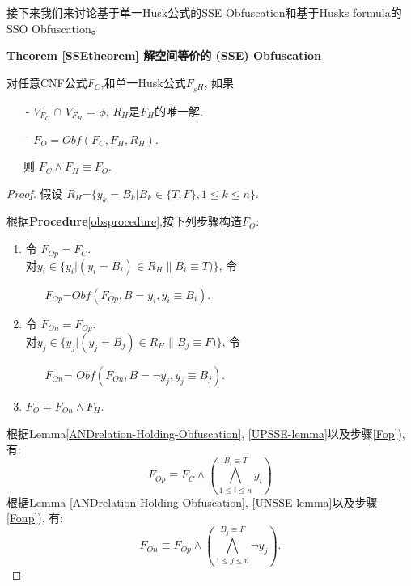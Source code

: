 接下来我们来讨论基于单一Husk公式的SSE Obfuscation和基于Husks formula的SSO Obfuscation。

\textbf{Theorem \ref{SSEtheorem} 解空间等价的 (SSE) Obfuscation}

对任意CNF公式$F_C$,和单一Husk公式$F_{_SH}$, 如果
\begin{enumerate}
 \item[-] $V_{F_C}$ $\cap$ $V_{F_H}$ = $\phi$, $R_H$是$F_H$的唯一解.
 \item[-] $F_O=Obf(F_C,F_H,R_H)$.
\end{enumerate}
~~~则 $F_C\wedge F_H \equiv F_O$.
\begin{proof}

假设 $R_H$=$\{y_k=B_k| B_k \in \{T,F\}, 1\leqslant k\leqslant n\}$.

根据\textbf{Procedure}\ref{obsprocedure},按下列步骤构造$F_O$:
\begin{enumerate}
\item \label{Fop}
令 $F_{Op}=F_C$.  \\
对$y_i \in \{y_i|(y_i=B_{i})\in R_H \parallel B_i\equiv T)\}$, 令
\begin{itemize}
 \item[] $F_{Op}$=$Obf(F_{Op},B=y_i,{y_i\equiv B_i})$.
\end{itemize}
\item  \label{Fonp}
令 $F_{On}=F_{Op}$. \\
对$y_j \in \{y_j|(y_j=B_j)\in R_H \parallel B_j\equiv F)\}$, 令
\begin{itemize}
 \item[] $F_{On}$= $Obf(F_{On},B=\neg y_j,{y_j\equiv B_j})$.
\end{itemize}
\item  \label{SSEFOend}
$F_{O}=F_{On}\wedge F_H$.
\end{enumerate}
根据Lemma\ref{ANDrelation-Holding-Obfuscation}, \ref{UPSSE-lemma}以及步骤\ref{Fop}), 有:
\begin{equation}\label{SSEFOP}
F_{Op} \equiv F_C\wedge (\bigwedge_{1\leqslant i\leqslant n}^{B_i \equiv T}y_i)
\end{equation}
根据Lemma \ref{ANDrelation-Holding-Obfuscation}, \ref{UNSSE-lemma}以及步骤\ref{Fonp}), 有:
\begin{equation}\label{SSEFON}
F_{On} \equiv F_{Op}\wedge (\bigwedge_{1\leqslant j\leqslant n}^{B_j \equiv F}\neg y_j).
\end{equation}

\end{proof}
